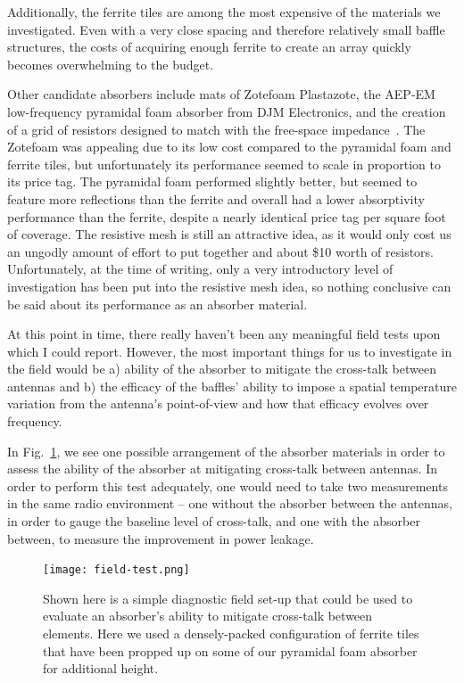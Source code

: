 Additionally, the ferrite tiles are among the most expensive of the materials 
we investigated. Even with a very close spacing and therefore relatively small 
baffle structures, the costs of acquiring enough ferrite to create an array 
quickly becomes overwhelming to the budget.

Other candidate absorbers include mats of Zotefoam Plastazote\textregistered, 
the AEP-EM low-frequency pyramidal foam absorber from DJM Electronics, and the 
creation of a grid of resistors designed to match with the free-space 
impedance~\citep{mahesh2015}. The Zotefoam was appealing due to its low cost 
compared to the pyramidal foam and ferrite tiles, but unfortunately its 
performance seemed to scale in proportion to its price tag.  The pyramidal foam 
performed slightly better, but seemed to feature more reflections than the 
ferrite and overall had a lower absorptivity performance than the ferrite, 
despite a nearly identical price tag per square foot of coverage. The resistive 
mesh is still an attractive idea, as it would only cost us an ungodly amount of 
effort to put together and about \$10 worth of resistors. Unfortunately, at the 
time of writing, only a very introductory level of investigation has been put 
into the resistive mesh idea, so nothing conclusive can be said about its 
performance as an absorber material.

At this point in time, there really haven't been any meaningful field tests 
upon which I could report. However, the most important things for us to 
investigate in the field would be a) ability of the absorber to mitigate the 
cross-talk between antennas and b) the efficacy of the baffles' ability to 
impose a spatial temperature variation from the antenna's point-of-view and how 
that efficacy evolves over frequency.

In Fig.~\ref{fig:field-test}, we see one possible arrangement of the absorber 
materials in order to assess the ability of the absorber at mitigating 
cross-talk between antennas. In order to perform this test adequately, one 
would need to take two measurements in the same radio environment -- one 
without the absorber between the antennas, in order to gauge the baseline level 
of cross-talk, and one with the absorber between, to measure the improvement in 
power leakage.

\begin{figure}
    \begin{center}
    \texttt{[image: field-test.png]}
    \end{center}
    \caption{
        Shown here is a simple diagnostic field set-up that could be used to 
        evaluate an absorber's ability to mitigate cross-talk between elements.  
        Here we used a densely-packed configuration of ferrite tiles that have 
        been propped up on some of our pyramidal foam absorber for additional 
        height.
    }
    \label{fig:field-test}
\end{figure}
